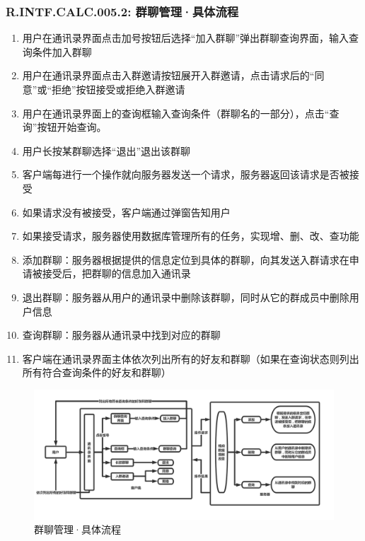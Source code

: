         \subsubsection{R.INTF.CALC.005.2: 群聊管理·具体流程}
        \begin{enumerate}
            \item 用户在通讯录界面点击加号按钮后选择“加入群聊”弹出群聊查询界面，输入查询条件加入群聊
            \item 用户在通讯录界面点击入群邀请按钮展开入群邀请，点击请求后的“同意”或“拒绝”按钮接受或拒绝入群邀请
            \item 用户在通讯录界面上的查询框输入查询条件（群聊名的一部分），点击“查询”按钮开始查询。
            \item 用户长按某群聊选择“退出”退出该群聊
            \item 客户端每进行一个操作就向服务器发送一个请求，服务器返回该请求是否被接受
            \item 如果请求没有被接受，客户端通过弹窗告知用户
            \item 如果接受请求，服务器使用数据库管理所有的任务，实现增、删、改、查功能
            \item 添加群聊：服务器根据提供的信息定位到具体的群聊，向其发送入群请求在申请被接受后，把群聊的信息加入通讯录
            \item 退出群聊：服务器从用户的通讯录中删除该群聊，同时从它的群成员中删除用户信息
            \item 查询群聊：服务器从通讯录中找到对应的群聊
            \item 客户端在通讯录界面主体依次列出所有的好友和群聊（如果在查询状态则列出所有符合查询条件的好友和群聊）
        \end{enumerate}
        \newpage
        \begin{figure}[h]
            \centering
            \includegraphics[scale=0.4]{OutlineDesign/figures/群聊管理·具体流程.png}
            \caption{群聊管理·具体流程}
            \label{fig:server_flow}
        \end{figure}

